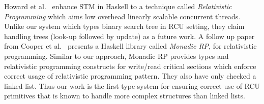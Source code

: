 Howard et al.~\cite{Howard:2011:RES:2001252.2001267} enhance \textsf{STM} in Haskell to a technique called \textit{Relativistic Programming} which aims low overhead linearly scalable concurrent threads. Unlike our system which types binary search tree in \textsf{RCU} setting, they claim  handling trees (look-up followed by update) as a future work.
A follow up paper from Cooper et al.~\cite{Cooper2015RelativisticPI} presents a \textsf{Haskell} library called \emph{Monadic RP}, for relativistic programming. Similar to our approach, Monadic RP provides types and relativistic programming constructs for write/read critical sections which enforce correct usage of relativistic programming pattern. 
They also have only checked a linked list.
Thus our work is the first type system for ensuring correct use of RCU primitives that is known to handle more complex structures than linked lists.
